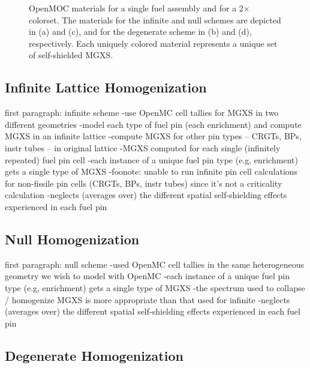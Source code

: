 \begin{figure}[h!]
\begin{subfigure}{.5\textwidth}
  \caption{}
  \label{fig:chap8-2x2-degenerate-materials}
\end{subfigure}
\caption[Depiction of infinite, null and degenerate spatial homogenization schemes]{OpenMOC materials for a single fuel assembly and for a 2$\times$ colorset. The materials for the infinite and null schemes are depicted in (a) and (c), and for the degenerate scheme in (b) and (d), respectively. Each uniquely colored material represents a unique set of self-shielded \ac{MGXS}.}
\label{fig:chap8-homogenization-schemes}
\end{figure}

\subsection{Infinite Lattice Homogenization}
\label{subsec:chap8-infinite}

first paragraph: infinite scheme
-use OpenMC cell tallies for \ac{MGXS} in two different geometries
-model each type of fuel pin (each enrichment) and compute \ac{MGXS} in an infinite lattice
-compute \ac{MGXS} for other pin types -- \acp{CRGT}, \acp{BP}, instr tubes -- in original lattice
-\ac{MGXS} computed for each single (infinitely repeated) fuel pin cell 
-each instance of a unique fuel pin type (e.g, enrichment) gets a single type of \ac{MGXS}
-foonote: unable to run infinite pin cell calculations for non-fissile pin cells (CRGTs, BPs, instr tubes) since it's not a criticality calculation
-neglects (averages over) the different spatial self-shielding effects experienced in each fuel pin

\subsection{Null Homogenization}
\label{subsec:chap8-null}

first paragraph: null scheme
-used OpenMC cell tallies in the same heterogeneous geometry we wish to model with OpenMC
-each instance of a unique fuel pin type (e.g, enrichment) gets a single type of \ac{MGXS}
-the spectrum used to collapse / homogenize \ac{MGXS} is more appropriate than that used for infinite
-neglects (averages over) the different spatial self-shielding effects experienced in each fuel pin

\subsection{Degenerate Homogenization}
\label{subsec:chap8-degenerate}

